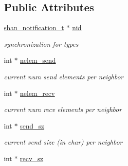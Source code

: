 \subsection*{Public Attributes}
\begin{DoxyCompactItemize}
\item 
\hyperlink{structshan__notification__t}{shan\+\_\+notification\+\_\+t} $\ast$ \hyperlink{structtype__local__t_a539eb4f70c6d42aa34d37da44878c250}{nid}\hypertarget{structtype__local__t_a539eb4f70c6d42aa34d37da44878c250}{}\label{structtype__local__t_a539eb4f70c6d42aa34d37da44878c250}

\begin{DoxyCompactList}\small\item\em synchronization for types \end{DoxyCompactList}\item 
int $\ast$ \hyperlink{structtype__local__t_a411a0a1a6eda5686f746f3de1f20c6e3}{nelem\+\_\+send}\hypertarget{structtype__local__t_a411a0a1a6eda5686f746f3de1f20c6e3}{}\label{structtype__local__t_a411a0a1a6eda5686f746f3de1f20c6e3}

\begin{DoxyCompactList}\small\item\em current num send elements per neighbor \end{DoxyCompactList}\item 
int $\ast$ \hyperlink{structtype__local__t_af839d7095a08b4a8345b213b9818f8a8}{nelem\+\_\+recv}\hypertarget{structtype__local__t_af839d7095a08b4a8345b213b9818f8a8}{}\label{structtype__local__t_af839d7095a08b4a8345b213b9818f8a8}

\begin{DoxyCompactList}\small\item\em current num recv elements per neighbor \end{DoxyCompactList}\item 
int $\ast$ \hyperlink{structtype__local__t_ab351d8e498f4f28d06e428b3905ff2d6}{send\+\_\+sz}\hypertarget{structtype__local__t_ab351d8e498f4f28d06e428b3905ff2d6}{}\label{structtype__local__t_ab351d8e498f4f28d06e428b3905ff2d6}

\begin{DoxyCompactList}\small\item\em current send size (in char) per neighbor \end{DoxyCompactList}\item 
int $\ast$ \hyperlink{structtype__local__t_a15d3eb64719efc49430810bcb9fdb307}{recv\+\_\+sz}\hypertarget{structtype__local__t_a15d3eb64719efc49430810bcb9fdb307}{}\label{structtype__local__t_a15d3eb64719efc49430810bcb9fdb307}


\end{DoxyCompactItemize}
